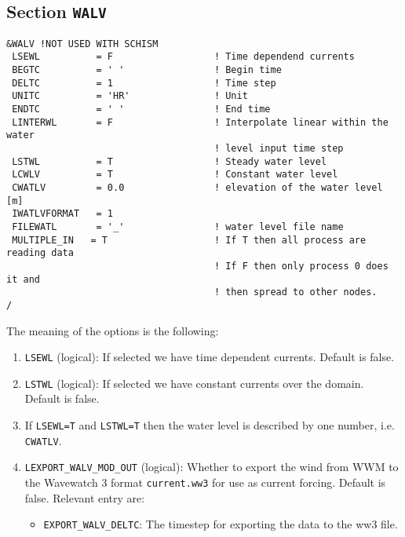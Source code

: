\documentclass[12pt]{amsart}
\begin{document}
\subsection{Section {\tt WALV}}
\begin{verbatim}
&WALV !NOT USED WITH SCHISM
 LSEWL          = F                  ! Time dependend currents
 BEGTC          = ' '                ! Begin time
 DELTC          = 1                  ! Time step
 UNITC          = 'HR'               ! Unit
 ENDTC          = ' '                ! End time
 LINTERWL       = F                  ! Interpolate linear within the water
                                     ! level input time step
 LSTWL          = T                  ! Steady water level
 LCWLV          = T                  ! Constant water level
 CWATLV         = 0.0                ! elevation of the water level [m]
 IWATLVFORMAT   = 1
 FILEWATL       = '_'                ! water level file name
 MULTIPLE_IN   = T                   ! If T then all process are reading data
                                     ! If F then only process 0 does it and
                                     ! then spread to other nodes.
/
\end{verbatim}



The meaning of the options is the following:
\begin{enumerate}
\item {\tt LSEWL} (logical): If selected we have time dependent currents. Default is false.
\item {\tt LSTWL} (logical): If selected we have constant currents over the domain. Default is false.
\item If {\tt LSEWL=T} and {\tt LSTWL=T} then the water level is described by one number, i.e. {\tt CWATLV}.
\item {\tt LEXPORT\_WALV\_MOD\_OUT} (logical): Whether to export the wind from WWM to the Wavewatch 3 format {\tt current.ww3} for use as current forcing. Default is false. Relevant entry are:
  \begin{itemize}
  \item {\tt EXPORT\_WALV\_DELTC}: The timestep for exporting the data to the ww3 file.
  \end{itemize}
\end{enumerate}

\newpage
\end{document}
